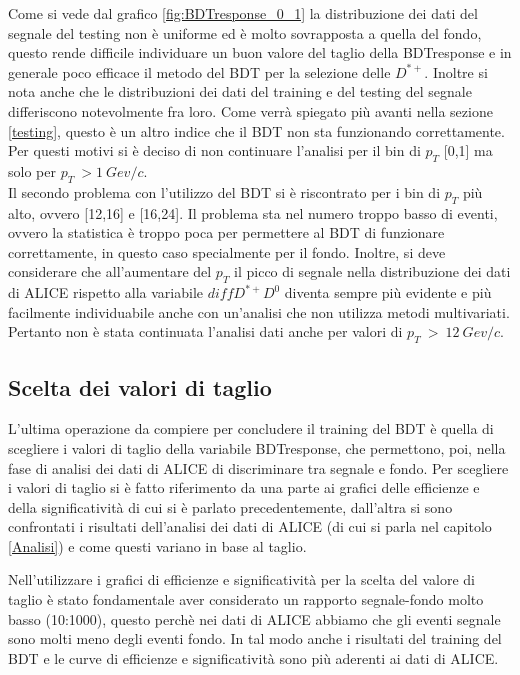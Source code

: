 Come si vede dal grafico \ref{fig:BDTresponse_0_1} la distribuzione dei dati del segnale del testing non è uniforme ed è molto sovrapposta a quella del fondo, questo rende difficile individuare un buon valore del taglio della BDTresponse e in generale poco efficace il metodo del BDT per la selezione delle $D^{*+}$. Inoltre si nota anche che le distribuzioni dei dati del training e del testing del segnale differiscono notevolmente fra loro. Come verrà spiegato più avanti nella sezione \ref{testing}, questo è un altro indice che il BDT non sta funzionando correttamente. Per questi motivi si è deciso di non continuare l'analisi per il bin di $p_T$ [0,1] ma solo per $p_T \ > 1 \  Gev/c$. 
\\Il secondo problema con l'utilizzo del BDT si è riscontrato per i bin di $p_T$ più alto, ovvero [12,16] e [16,24].  Il problema sta nel numero troppo basso di eventi, ovvero la statistica è troppo poca per permettere al BDT di funzionare correttamente, in questo caso specialmente per il fondo. Inoltre, si deve considerare che all'aumentare del $p_T$ il picco di segnale nella distribuzione dei dati di ALICE rispetto alla variabile $diffD^{*+}D^0$ diventa sempre più evidente e più facilmente individuabile anche con un'analisi che non utilizza metodi multivariati. Pertanto non è stata continuata l'analisi dati anche per valori di $p_T \ > \ 12 \ Gev/c$. 




\subsection{Scelta dei valori di taglio}

L'ultima operazione da compiere per concludere il training del BDT è quella di scegliere i valori di taglio della variabile BDTresponse, che permettono, poi, nella fase di analisi dei dati di ALICE di discriminare tra segnale e fondo. Per scegliere i valori di taglio si è fatto riferimento da una parte ai grafici delle efficienze e della significatività di cui si è parlato precedentemente, dall'altra si sono confrontati i risultati dell'analisi dei dati di ALICE (di cui si parla nel capitolo \ref{Analisi}) e come questi variano in base al taglio. 

Nell'utilizzare i grafici di efficienze e significatività per la scelta del valore di taglio è stato fondamentale aver considerato un rapporto segnale-fondo molto basso (10:1000), questo perchè nei dati di ALICE abbiamo che gli eventi segnale sono molti meno degli eventi fondo. In tal modo anche i risultati del training del BDT e le curve di efficienze e significatività sono più aderenti ai dati di ALICE.

